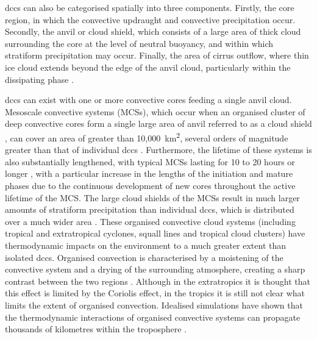 \acrshort{dcc}s can also be categorised spatially into three components.
Firstly, the core region, in which the convective updraught and convective precipitation occur.
Secondly, the anvil or cloud shield, which consists of a large area of thick cloud surrounding the core at the level of neutral buoyancy, and within which stratiform precipitation may occur.
Finally, the area of cirrus outflow, where thin ice cloud extends beyond the edge of the anvil cloud, particularly within the dissipating phase \citep{lilly_cirrus_1988}.

\acrshort{dcc}s can exist with one or more convective cores feeding a single anvil cloud.
Mesoscale convective systems (MCSs), which occur when an organised cluster of deep convective cores form a single large area of anvil referred to as a cloud shield \citep{roca_simple_2017}, can cover an area of greater than 10,000~km\textsuperscript{2}, several orders of magnitude greater than that of individual \acrshort{dcc}s \citep{houze_mesoscale_2004}.
Furthermore, the lifetime of these systems is also substantially lengthened, with typical MCSs lasting for 10 to 20 hours or longer \citep{chen_diurnal_1997}, with a particular increase in the lengths of the initiation and mature phases \citep{wall_life_2018} due to the continuous development of new cores throughout the active lifetime of the MCS.
The large cloud shields of the MCSs result in much larger amounts of stratiform precipitation than individual \acrshort{dcc}s, which is distributed over a much wider area \citep{houze_chapter_2014}.
These organised convective cloud systems (including tropical and extratropical cyclones, squall lines and tropical cloud clusters) have thermodynamic impacts on the environment to a much greater extent than isolated \acrshort{dcc}s.
Organised convection is characterised by a moistening of the convective system and a drying of the surrounding atmosphere, creating a sharp contrast between the two regions \citep{houze_chapter_2014}.
Although in the extratropics it is thought that this effect is limited by the Coriolis effect, in the tropics it is still not clear what limits the extent of organised convection.
Idealised simulations have shown that the thermodynamic interactions of organised convective systems can propagate thousands of kilometres within the troposphere \citep{beucler_budget_2019}.


